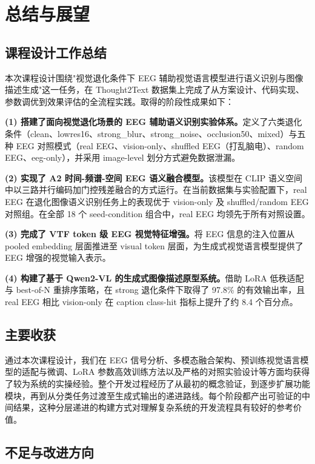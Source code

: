 \section{总结与展望}

\subsection{课程设计工作总结}

本次课程设计围绕"视觉退化条件下 EEG 辅助视觉语言模型进行语义识别与图像描述生成"这一任务，在 Thought2Text 数据集上完成了从方案设计、代码实现、参数调优到效果评估的全流程实践。取得的阶段性成果如下：

\textbf{(1) 搭建了面向视觉退化场景的 EEG 辅助语义识别实验体系。}定义了六类退化条件（clean、lowres16、strong\_blur、strong\_noise、occlusion50、mixed）与五种 EEG 对照模式（real EEG、vision-only、shuffled EEG（打乱脑电）、random EEG、eeg-only），并采用 image-level 划分方式避免数据泄漏。

\textbf{(2) 实现了 A2 时间-频谱-空间 EEG 语义融合模型。}该模型在 CLIP 语义空间中以三路并行编码加门控残差融合的方式运行。在当前数据集与实验配置下，real EEG 在退化图像语义识别任务上的表现优于 vision-only 及 shuffled/random EEG 对照组。在全部 18 个 seed-condition 组合中，real EEG 均领先于所有对照设置。

\textbf{(3) 完成了 VTF token 级 EEG 视觉特征增强。}将 EEG 信息的注入位置从 pooled embedding 层面推进至 visual token 层面，为生成式视觉语言模型提供了 EEG 增强的视觉输入表示。

\textbf{(4) 构建了基于 Qwen2-VL 的生成式图像描述原型系统。}借助 LoRA 低秩适配与 best-of-N 重排序策略，在 strong 退化条件下取得了 97.8\% 的有效输出率，且 real EEG 相比 vision-only 在 caption class-hit 指标上提升了约 8.4 个百分点。

\subsection{主要收获}

通过本次课程设计，我们在 EEG 信号分析、多模态融合架构、预训练视觉语言模型的适配与微调、LoRA 参数高效训练方法以及严格的对照实验设计等方面均获得了较为系统的实操经验。整个开发过程经历了从最初的概念验证，到逐步扩展功能模块，再到从分类任务过渡至生成式输出的递进路线。每个阶段都产出可验证的中间结果，这种分层递进的构建方式对理解复杂系统的开发流程具有较好的参考价值。

\subsection{不足与改进方向}

